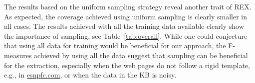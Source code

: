 The results based on the uniform sampling strategy reveal another trait of REX. 
As expected, the coverage achieved using uniform sampling is clearly smaller in all cases. 
The results achieved with all the training data available clearly show the importance of sampling, see Table~\ref{tab:overall}. 
While one could conjecture that using all data for training would be beneficial for our approach, the F-measures achieved by using all the data suggest that sampling can be beneficial for the extraction, especially when the web pages do not follow a rigid template, e.g., in \url{esnpfc.com}, or when the data in the  \ac{KB} is noisy. 
